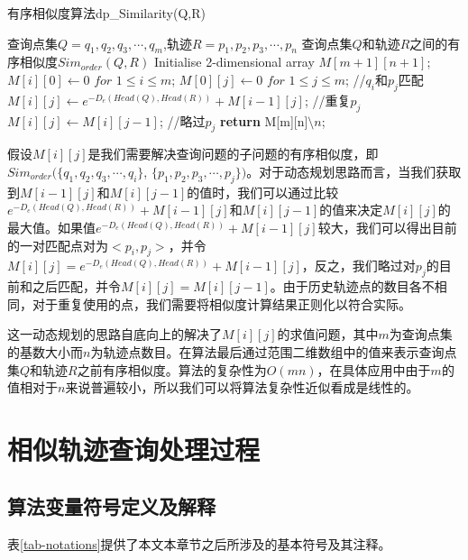 \begin{algorithm}
\caption{有序相似度算法dp\_Similarity(Q,R)}
\label{algo:dp-sim}
\begin{algorithmic}[1] %
\Require 查询点集$Q={q_1,q_2,q_3,\cdots,q_m}$,轨迹$R={p_1,p_2,p_3,\cdots,p_n}$
\Ensure 查询点集$Q$和轨迹$R$之间的有序相似度$Sim_{order}(Q,R)$
\State Initialise 2-dimensional array $M[m+1][n+1]$;
\State $M[i][0] \gets 0$ $for$ $1\leq i\leq m$;
\State $M[0][j] \gets 0$ $for$ $1\leq j\leq m$;
		//$q_i$和$p_j$匹配
		\State $M[i][j] \gets e^{-D_{e}(Head(Q),Head(R))} + M[i-1][j]$; //重复$p_j$
		\Else 
		\State $M[i][j] \gets M[i][j-1]$; //略过$p_j$
		\EndIf
	\EndFor
	\State \textbf{return} M[m][n]$\setminus n$;
\EndFor
\end{algorithmic}
\end{algorithm}

假设$M[i][j]$是我们需要解决查询问题的子问题的有序相似度，即$Sim_{order}(\{q_1,q_2,q_3,\cdots,q_i\}$, $\{p_1,p_2,p_3,\cdots,p_j\})$。对于动态规划思路而言，当我们获取到$M[i-1][j]$和$M[i][j-1]$的值时，我们可以通过比较$e^{-D_{e}(Head(Q),Head(R))} + M[i-1][j]$和$M[i][j-1]$的值来决定$M[i][j]$的最大值。如果值$e^{-D_{e}(Head(Q),Head(R))} + M[i-1][j]$较大，我们可以得出目前的一对匹配点对为$<p_i, p_j>$，并令$M[i][j] = e^{-D_{e}(Head(Q),Head(R))} + M[i-1][j]$，反之，我们略过对$p_j$的目前和之后匹配，并令$M[i][j]=M[i][j-1]$。由于历史轨迹点的数目各不相同，对于重复使用的点，我们需要将相似度计算结果正则化以符合实际。

这一动态规划的思路自底向上的解决了$M[i][j]$的求值问题，其中$m$为查询点集的基数大小而$n$为轨迹点数目。在算法最后通过范围二维数组中的值来表示查询点集$Q$和轨迹$R$之前有序相似度。算法的复杂性为$O(mn)$，在具体应用中由于$m$的值相对于$n$来说普遍较小，所以我们可以将算法复杂性近似看成是线性的。

\section{相似轨迹查询处理过程}
\label{sec:query processing}

\subsection{算法变量符号定义及解释}
\label{subsec:algorithm-definition-explanation}
表\ref{tab-notations}提供了本文本章节之后所涉及的基本符号及其注释。

